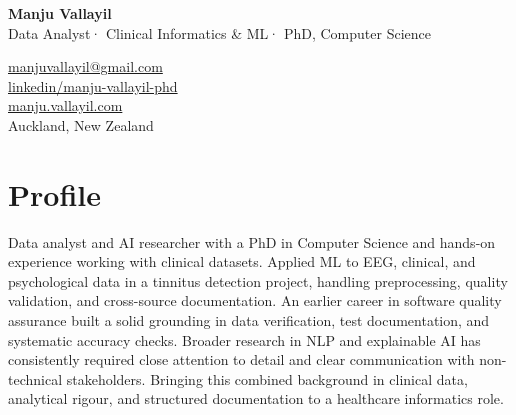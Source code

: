 \documentclass[10.5pt,a4paper]{article}
\begin{document}
\vspace*{-1.5cm}
\begin{tcolorbox}[
  enhanced, colback=accent, colframe=accent,
  arc=0pt, boxrule=0pt,
  left=1.8cm, right=1.8cm, top=16pt, bottom=14pt,
  enlarge left by=-1.8cm, enlarge right by=-1.8cm,
  width=\textwidth+3.6cm
]
  \begin{minipage}[t]{0.54\linewidth}
    {\color{white}\LARGE\bfseries Manju Vallayil}\\[5pt]
    {\color{white!65!accent}\small
      Data Analyst\enspace·\enspace
      Clinical Informatics \& ML\enspace·\enspace
      PhD, Computer Science}
  \end{minipage}%
  \hfill
  \begin{minipage}[t]{0.43\linewidth}
    \raggedleft\small\color{white!80!accent}
    \faEnvelope\enspace
      \href{mailto:manjuvallayil@gmail.com}{\textcolor{white!80!accent}{manjuvallayil@gmail.com}}\\[3pt]
    \faLinkedin\enspace
      \href{https://linkedin.com/in/manju-vallayil-phd-5b1b7a142/}{\textcolor{white!80!accent}{linkedin/manju-vallayil-phd}}\\[3pt]
    \faGlobe\enspace
      \href{https://manju.vallayil.com}{\textcolor{white!80!accent}{manju.vallayil.com}}\\[3pt]
    \faMapMarker*\enspace Auckland, New Zealand
  \end{minipage}
\end{tcolorbox}

\vspace{12pt}

\section{Profile}

Data analyst and AI researcher with a PhD in Computer Science and hands-on experience
working with clinical datasets. Applied ML to EEG, clinical, and psychological data in a
tinnitus detection project, handling preprocessing, quality validation, and cross-source
documentation. An earlier career in software quality assurance built a solid grounding in
data verification, test documentation, and systematic accuracy checks. Broader research in
NLP and explainable AI has consistently required close attention to detail and clear
communication with non-technical stakeholders. Bringing this combined background in clinical
data, analytical rigour, and structured documentation to a healthcare informatics role.
\end{document}
